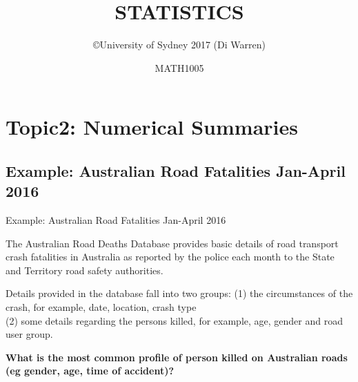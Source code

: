 \documentclass[t,xcolor=pdftex,dvipsnames,table]{beamer}
\title{\Huge STATISTICS}
\subtitle{}
\author{\copyright University of Sydney 2017 (Di Warren)}
\date{MATH1005}
\begin{document}


\section[2]{Topic2: Numerical Summaries}

\subsection[]{Example: Australian Road Fatalities Jan-April 2016}

\begin{frame}[fragile]{Example: Australian Road Fatalities Jan-April 2016}

The Australian Road Deaths Database provides basic details of road transport crash fatalities in Australia as reported by the police each month to the State and Territory road safety authorities.

\vspace{.5cm}
Details provided in the database fall into two groups:
(1) the circumstances of the crash, for example, date, location, crash type \\
(2) some details regarding the persons killed, for example, age, gender and road user group.

\vspace{.5cm}
{\bf What is the most common profile of person killed on Australian roads (eg gender, age, time of accident)?}

\vspace{.5cm}
\href{https://bitre.gov.au/statistics/safety/fatal_road_crash_database.aspx}{}
\end{frame}
\end{document}
